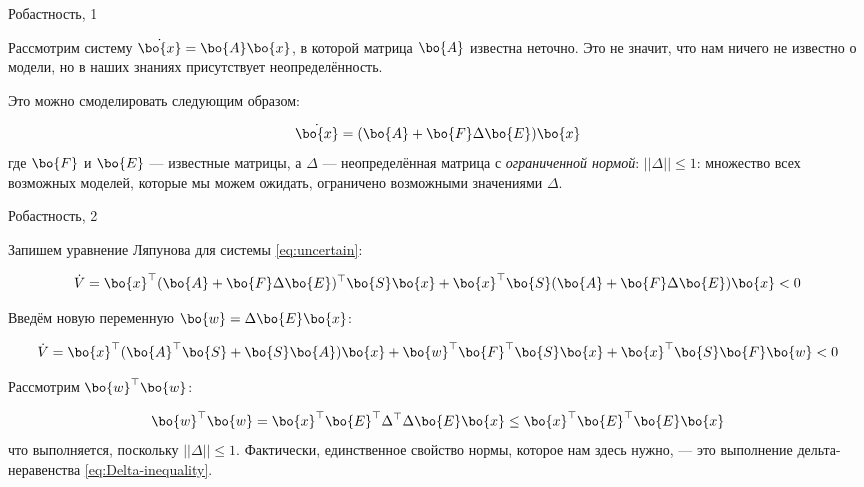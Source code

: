 \documentclass{beamer}
\begin{document}
\begin{frame}{Робастность, 1}
	\begin{flushleft}
		
		Рассмотрим систему $\dot{\bo{x}} = \bo{A}\bo{x}$, в которой матрица $\bo{A}$ известна неточно. Это не значит, что нам ничего не известно о модели, но в наших знаниях присутствует неопределённость.
		
		\bigskip
		
		Это можно смоделировать следующим образом:
		
		\begin{equation}
			\label{eq:uncertain}
			\dot{\bo{x}} = (\bo{A} + \bo{F} \Delta \bo{E})\bo{x}
		\end{equation}
		где $\bo{F}$ и $\bo{E}$ — известные матрицы, а $\Delta$ — неопределённая матрица с \emph{ограниченной нормой}: $||\Delta|| \leq 1$: множество всех возможных моделей, которые мы можем ожидать, ограничено возможными значениями $\Delta$.
		
	\end{flushleft}
\end{frame}

\begin{frame}{Робастность, 2}
	\begin{flushleft}
		
		Запишем уравнение Ляпунова для системы \eqref{eq:uncertain}:
		
		\begin{equation}
			\dot V = \bo{x}^\top 
			(\bo{A} + \bo{F} \Delta \bo{E})^\top\bo{S}\bo{x} + \bo{x}^\top\bo{S} (\bo{A} + \bo{F} \Delta \bo{E}) \bo{x} < 0
		\end{equation}
		
		Введём новую переменную $\bo{w} = \Delta \bo{E}\bo{x}$:
		
		\begin{equation}
			\label{eq:Lyapunov_xw}
			\dot V = \bo{x}^\top 
			(\bo{A}^\top \bo{S} + \bo{S}\bo{A}) \bo{x} + 
			\bo{w}^\top \bo{F}^\top\bo{S} \bo{x} +
			\bo{x}^\top \bo{S}\bo{F} \bo{w} < 0
		\end{equation}
		
		Рассмотрим $\bo{w}^\top \bo{w}$:
		
		\begin{equation}
			\label{eq:Delta-inequality}
			\bo{w}^\top \bo{w} = 
			\bo{x}^\top\bo{E}^\top \Delta^\top \Delta \bo{E}\bo{x}
			\leq
			\bo{x}^\top\bo{E}^\top \bo{E}\bo{x}
		\end{equation}		
		что выполняется, поскольку $|| \Delta ||\leq 1$. Фактически, единственное свойство нормы, которое нам здесь нужно, — это выполнение дельта-неравенства \eqref{eq:Delta-inequality}.
		
	\end{flushleft}
\end{frame}
\end{document}
